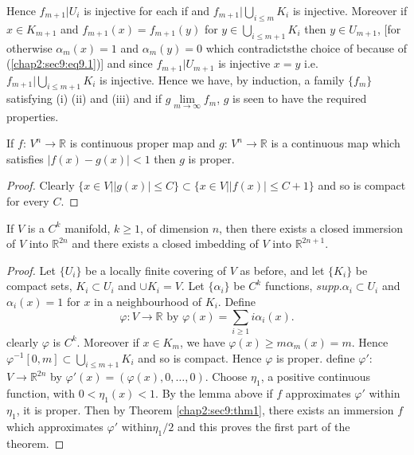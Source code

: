 Hence $f_{m+1}| U_i$ is injective for each if and $f_{m+1}| \bigcup
\limits_{i \leq m} K_i$ is injective. Moreover if $x \in K_{m+1}$ and
$f_{m+1}(x)=f_{m+1}(y)$ for $y \in \bigcup \limits_{i \leq m+1} K_i$
then $y \in U_{m+1}$, [for otherwise $\alpha_m (x)=1$ and $\alpha_m(y)=0$ which
  contradicts\pageoriginale the choice of because of
  (\ref{chap2:sec9:eq9.1})] and since $f_{m+1}| 
U_{m+1}$ is injective $x=y$ i.e. $f_{m+1}| \bigcup \limits_{i \leq
  m+1} K_i$ is injective. Hence we have, by induction, a family $\{
f_m \}$ satisfying (i) (ii) and (iii) and if $g \lim \limits _{m \to
\infty} f_m$, $g$ is seen to have the required properties. 

\begin{lemma}\label{chap2:sec9:lem3}%
  If $f$: $V^n \to \mathbb{R}$ is continuous proper map and $g$: $V^n
  \to \mathbb{R}$ is a continuous map which satisfies $|f(x)-g(x)|<1$
  then $g$ is proper. 
\end{lemma}

\begin{proof}
  Clearly $\{ x \in V \big | |g(x) |\leq C \} \subset \{ x \in V \big|
  |f(x)|\leq C+1 \}$ and so is compact for every $C$. 
\end{proof}

\begin{theorem}[Whitney]\label{chap2:sec9:thm3} %
  If $V$ is a $C^k$ manifold, $k \geq 1$, of dimension $n$, then there
  exists a closed immersion of $V$ into $\mathbb{R}^{2n}$ and there
  exists a closed imbedding of $V$ into $\mathbb{R}^{2n+1}$. 
\end{theorem}

\begin{proof}
  Let $\{ U_i \}$ be a locally finite covering of $V$ as before, and
  let $\{ K_i \}$ be compact sets, $K_i \subset U_i$ and $\cup K_i
  =V$. Let $\{ \alpha_i \}$ be $C^k$ functions, $supp. \alpha_i
  \subset U_i$ and $\alpha_i (x)=1$ for $x$ in a neighbourhood of
  $K_i$. Define 
  $$
  \varphi:V \to \mathbb{R} \text{ by } \varphi (x)= \sum_{i \geq 1}i \alpha_i (x).
  $$
  clearly $\varphi$ is $C^k$. Moreover if $x \in K_m$, we have
  $\varphi (x) \geq m \alpha_m (x)=m$. Hence $\varphi^{-1}[0, m]
  \subset \bigcup \limits_{i \leq m+1} K_i$ and so is compact. Hence
  $\varphi$ is proper. define $\varphi '$: $V \to
  \mathbb{R}^{2n}$ by $\varphi '(x)=(\varphi(x), 0, \ldots
  ,0)$. Choose $\eta_1$, a positive continuous function, with $0 <
  \eta_1(x)<1$. By the lemma above if $f$ approximates $\varphi'$
  within $\eta_1$, it is proper. Then by Theorem \ref{chap2:sec9:thm1}, there exists an
  immersion $f$ which approximates $\varphi'$ within\pageoriginale $\eta _1/2$ and
  this proves the first part of the theorem.
\end{proof}

